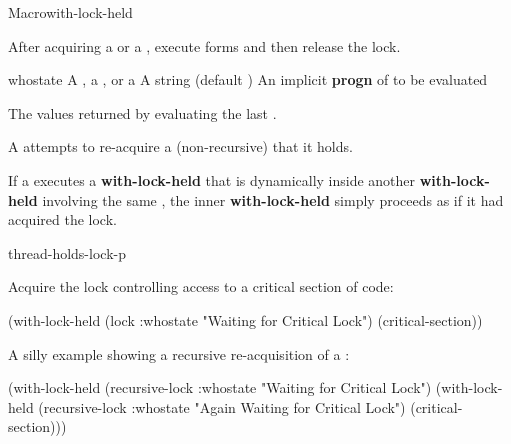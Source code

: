 \documentclass[10pt,twoside,english,pdftex]{article}
\begin{document}

\begin{functiondoc}{Macro}{with-lock-held}{\code{(} 
    \code{)}
    \superstar{} 
    \returns{} \superstar}
%
%
%
%

\fnsyntax

\fnpurpose After acquiring a  or a ,
execute forms and then release the lock.

\fnpackage {}

\fnmodule {}

\fnargs
\begin{args}{whostate}
\arg[lock] A , a , or a 
\arg[whostate] A string (default )
\arg[forms] An implicit \textbf{progn} of  to be evaluated
\end{args}

\fnreturns The values returned by evaluating the last .

\fnerrors A  attempts to re-acquire a (non-recursive)
 that it holds.
  
\fndescription If a  executes a \textbf{with-lock-held}
that is dynamically inside another \textbf{with-lock-held} involving
the same , the inner \textbf{with-lock-held}
simply proceeds as if it had acquired the lock.

\begin{alsos}{thread-holds-lock-p}
\end{alsos}

\fnexamples
Acquire the lock controlling access to a critical section of code:
\begin{example}
  (with-lock-held (lock :whostate "Waiting for Critical Lock")
    (critical-section))
\end{example}

A silly example showing a recursive re-acquisition of a
:
\begin{example}
  (with-lock-held (recursive-lock :whostate "Waiting for Critical Lock")
    (with-lock-held (recursive-lock :whostate "Again Waiting for Critical Lock")
      (critical-section)))
\end{example}


\end{functiondoc}
\end{document}
